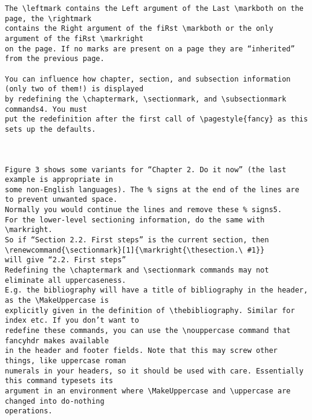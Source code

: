 \begin{verbatim}
The \leftmark contains the Left argument of the Last \markboth on the page, the \rightmark
contains the Right argument of the fiRst \markboth or the only argument of the fiRst \markright
on the page. If no marks are present on a page they are “inherited” from the previous page.

You can influence how chapter, section, and subsection information (only two of them!) is displayed
by redefining the \chaptermark, \sectionmark, and \subsectionmark commands4. You must
put the redefinition after the first call of \pagestyle{fancy} as this sets up the defaults.



Figure 3 shows some variants for “Chapter 2. Do it now” (the last example is appropriate in
some non-English languages). The % signs at the end of the lines are to prevent unwanted space.
Normally you would continue the lines and remove these % signs5.
For the lower-level sectioning information, do the same with \markright.
So if “Section 2.2. First steps” is the current section, then
\renewcommand{\sectionmark}[1]{\markright{\thesection.\ #1}}
will give “2.2. First steps”
Redefining the \chaptermark and \sectionmark commands may not eliminate all uppercaseness.
E.g. the bibliography will have a title of bibliography in the header, as the \MakeUppercase is
explicitly given in the definition of \thebibliography. Similar for index etc. If you don’t want to
redefine these commands, you can use the \nouppercase command that fancyhdr makes available
in the header and footer fields. Note that this may screw other things, like uppercase roman
numerals in your headers, so it should be used with care. Essentially this command typesets its
argument in an environment where \MakeUppercase and \uppercase are changed into do-nothing
operations.






\end{verbatim}
